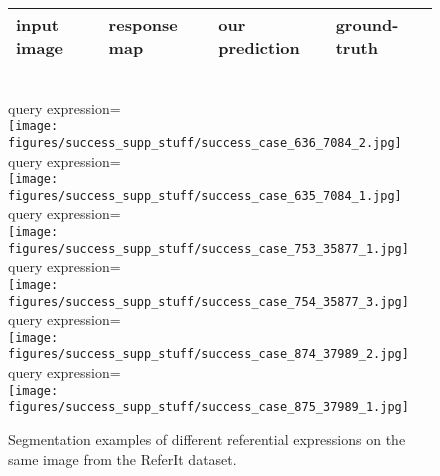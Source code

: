 \documentclass[runningheads]{llncs}
\begin{document}
\begin{figure}[t]
\centering
\begin{tabularx}{0.95\linewidth}{YYYY}
input image & response map & our prediction & ground-truth \\ \hline
\end{tabularx} \\
\small{query expression=} \\
\texttt{[image: figures/success\_supp\_stuff/success\_case\_636\_7084\_2.jpg]} \\
\small{query expression=} \\
\texttt{[image: figures/success\_supp\_stuff/success\_case\_635\_7084\_1.jpg]} \\
\small{query expression=} \\
\texttt{[image: figures/success\_supp\_stuff/success\_case\_753\_35877\_1.jpg]} \\
\small{query expression=} \\
\texttt{[image: figures/success\_supp\_stuff/success\_case\_754\_35877\_3.jpg]} \\
\small{query expression=} \\
\texttt{[image: figures/success\_supp\_stuff/success\_case\_874\_37989\_2.jpg]} \\
\small{query expression=} \\
\texttt{[image: figures/success\_supp\_stuff/success\_case\_875\_37989\_1.jpg]} \\
\caption{Segmentation examples of different referential expressions on the same image from the ReferIt dataset.}
\label{fig:diff_exp_same_image}
\end{figure}
\end{document}
